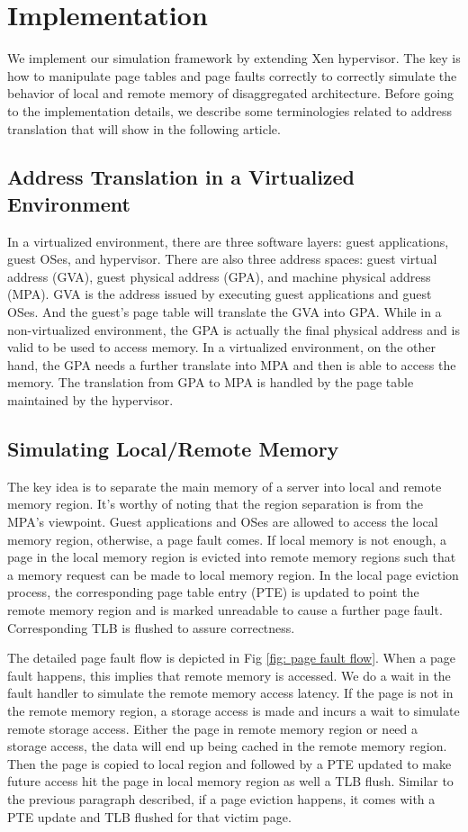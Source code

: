 \documentclass[twocolumn]{article}
\begin{document}
\section{Implementation}
We implement our simulation framework by extending Xen hypervisor. The key is how to manipulate page tables and page faults correctly to correctly simulate the behavior of local and remote memory of disaggregated architecture. Before going to the implementation details, we describe some terminologies related to address translation that will show in the following article.

\subsection{Address Translation in a Virtualized Environment}
In a virtualized environment, there are three software layers: guest applications, guest OSes, and hypervisor. There are also three address spaces: guest virtual address (GVA), guest physical address (GPA), and machine physical address (MPA). GVA is the address issued by executing guest applications and guest OSes. And the guest's page table will translate the GVA into GPA. While in a non-virtualized environment, the GPA is actually the final physical address and is valid to be used to access memory. In a virtualized environment, on the other hand, the GPA needs a further translate into MPA and then is able to access the memory. The translation from GPA to MPA is handled by the page table maintained by the hypervisor.

\subsection{Simulating Local/Remote Memory}
The key idea is to separate the main memory of a server into local and remote memory region. It's worthy of noting that the region separation is from the MPA's viewpoint. Guest applications and OSes are allowed to access the local memory region, otherwise, a page fault comes. If local memory is not enough, a page in the local memory region is evicted into remote memory regions such that a memory request can be made to local memory region. In the local page eviction process, the corresponding page table entry (PTE) is updated to point the remote memory region and is marked unreadable to cause a further page fault. Corresponding TLB is flushed to assure correctness.

The detailed page fault flow is depicted in Fig \ref{fig: page fault flow}. When a page fault happens, this implies that remote memory is accessed. We do a wait in the fault handler to simulate the remote memory access latency. If the page is not in the remote memory region, a storage access is made and incurs a wait to simulate remote storage access. Either the page in remote memory region or need a storage access, the data will end up being cached in the remote memory region. Then the page is copied to local region and followed by a PTE updated to make future access hit the page in local memory region as well a TLB flush. Similar to the previous paragraph described, if a page eviction happens, it comes with a PTE update and TLB flushed for that victim page.
\end{document}
